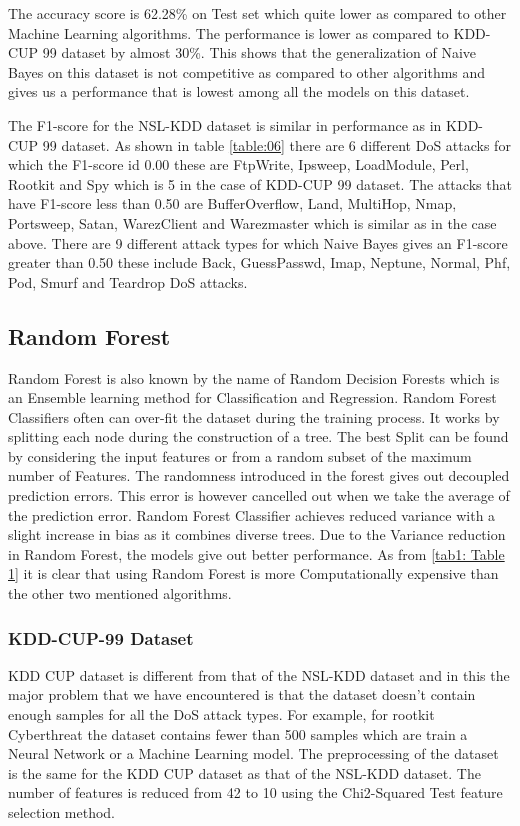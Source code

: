 \documentclass[conference]{IEEEtran}
\begin{document}
The accuracy score is 62.28\% on Test set which quite lower as compared to other Machine Learning algorithms. The performance is lower as compared to KDD-CUP 99 dataset by almost 30\%. This shows that the generalization of Naive Bayes on this dataset is not competitive as compared to other algorithms and gives us a performance that is lowest among all the models on this dataset.    

The F1-score for the NSL-KDD dataset is similar in performance as in KDD-CUP 99 dataset. As shown in table \ref{table:06} there are 6 different DoS attacks for which the F1-score id 0.00 these are FtpWrite, Ipsweep, LoadModule, Perl, Rootkit and Spy which is 5 in the case of KDD-CUP 99 dataset. The attacks that have F1-score less than 0.50 are BufferOverflow, Land, MultiHop, Nmap, Portsweep, Satan, WarezClient and Warezmaster which is similar as in the case above. There are 9 different attack types for which Naive Bayes gives an F1-score greater than 0.50 these include Back, GuessPasswd, Imap, Neptune, Normal, Phf, Pod, Smurf and Teardrop DoS attacks. 

\subsection{Random Forest}

Random Forest \cite{random_forest} is also known by the name of Random Decision Forests which is an Ensemble learning method for Classification and Regression. Random Forest Classifiers often can over-fit the dataset during the training process. It works by splitting each node during the construction of a tree. The best Split can be found by considering the input features or from a random subset of the maximum number of Features. The randomness introduced in the forest gives out decoupled prediction errors. This error is however cancelled out when we take the average of the prediction error. Random Forest Classifier achieves reduced variance with a slight increase in bias as it combines diverse trees. Due to the Variance reduction in Random Forest, the models give out better performance. As from \ref{tab1: Table 1} it is clear that using Random Forest is more Computationally expensive than the other two mentioned algorithms.

\subsubsection{KDD-CUP-99 Dataset}

KDD CUP dataset \cite{KDDcup99} is different from that of the NSL-KDD dataset and in this the major problem that we have encountered is that the dataset doesn't contain enough samples for all the DoS attack types. For example, for rootkit Cyberthreat the dataset contains fewer than 500 samples which are train a Neural Network or a Machine Learning model. The preprocessing of the dataset is the same for the KDD CUP dataset \cite{KDDcup99} as that of the NSL-KDD dataset. The number of features is reduced from 42 to 10 using the Chi2-Squared Test feature selection method. 
\end{document}
